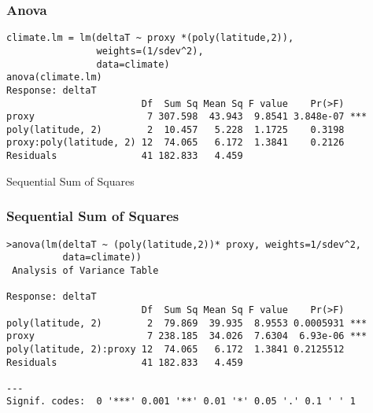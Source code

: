 \documentclass[]{beamer}
\begin{document}
\begin{frame}[fragile]
  \frametitle{Anova}
  \begin{small}
\begin{verbatim}
climate.lm = lm(deltaT ~ proxy *(poly(latitude,2)),
                weights=(1/sdev^2), 
                data=climate)
anova(climate.lm)
Response: deltaT
                        Df  Sum Sq Mean Sq F value    Pr(>F)    
proxy                    7 307.598  43.943  9.8541 3.848e-07 ***
poly(latitude, 2)        2  10.457   5.228  1.1725    0.3198    
proxy:poly(latitude, 2) 12  74.065   6.172  1.3841    0.2126    
Residuals               41 182.833   4.459  
\end{verbatim}
    
  \end{small}
Sequential Sum of Squares 
\end{frame}

\begin{frame}[fragile]
 \frametitle{Sequential Sum of Squares}
   \begin{small}
\begin{verbatim}
>anova(lm(deltaT ~ (poly(latitude,2))* proxy, weights=1/sdev^2,
          data=climate))
 Analysis of Variance Table

Response: deltaT
                        Df  Sum Sq Mean Sq F value    Pr(>F)    
poly(latitude, 2)        2  79.869  39.935  8.9553 0.0005931 ***
proxy                    7 238.185  34.026  7.6304  6.93e-06 ***
poly(latitude, 2):proxy 12  74.065   6.172  1.3841 0.2125512    
Residuals               41 182.833   4.459                      
                   
---
Signif. codes:  0 '***' 0.001 '**' 0.01 '*' 0.05 '.' 0.1 ' ' 1 
 
\end{verbatim}
\end{small}
\end{frame}
\end{document}
